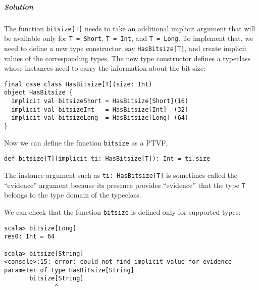 \subparagraph{Solution}

The function \lstinline!bitsize[T]! needs to take an additional implicit
argument that will be available only for \lstinline!T = Short!, \lstinline!T = Int!,
and \lstinline!T = Long!. To implement that, we need to define a
new type constructor, say \lstinline!HasBitsize[T]!, and create implicit
values of the corresponding types. The new type constructor defines
a typeclass whose instances need to carry the information about the
bit size:
\begin{lstlisting}
final case class HasBitsize[T](size: Int)
object HasBitsize {
  implicit val bitsizeShort = HasBitsize[Short](16)
  implicit val bitsizeInt   = HasBitsize[Int]  (32)
  implicit val bitsizeLong  = HasBitsize[Long] (64)
}
\end{lstlisting}
Now we can define the function \lstinline!bitsize! as a PTVF,
\begin{lstlisting}
def bitsize[T](implicit ti: HasBitsize[T]): Int = ti.size
\end{lstlisting}
The instance argument such as \lstinline!ti: HasBitsize[T]! is sometimes
called the ``evidence'' argument
because its presence provides ``evidence'' that the type \lstinline!T!
belongs to the type domain of the typeclass.

We can check that the function \lstinline!bitsize! is defined only
for supported types:
\begin{lstlisting}
scala> bitsize[Long]
res0: Int = 64

scala> bitsize[String]
<console>:15: error: could not find implicit value for evidence parameter of type HasBitsize[String]
       bitsize[String]
              ^ 
\end{lstlisting}

